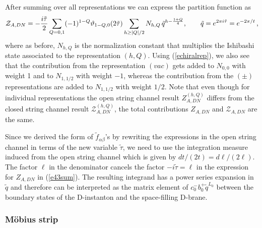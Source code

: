 \documentclass[12pt,a4paper]{article}
\newcommand{\refb}[1]{(\ref{#1})}
\newcommand{\I}{\mathrm{i}}
\newcommand{\vt}{\vartheta}
\newcommand{\cZ}{\mathcal{Z}}
\def\I{i}
\def\ttau{\tilde\tau}
\begin{document}
After summing over all representations we can express
the partition function as
\begin{align} \label{e43sum}
\cZ_{A,DN}
=-\frac{ \I  \ttau}{2}  \sum_{Q=0,1} (-1)^{1-Q}  \vt_{1-Q,0} ( 2 \ttau) \sum_{h\ge |Q|/2} N_{h,Q}\,
\tilde q^{h - {1 +Q \over 4} },
\qquad
\tilde q=e^{2\pi i\ttau} = e^{-2\pi/t}\,  ,
\end{align}
where as before, $N_{h,Q}$ is the normalization constant that multiplies the Ishibashi state
associated to the representation $(h,Q)$.
Using \refb{echiralrep}, we also see that the contribution from the representation $(vac)$
gets added to $N_{0,0}$ with weight 1 and to $N_{1,1/2}$ with weight $-1$,
whereas the contribution from the $(\pm)$ representations are added to $N_{1,1/2}$ with weight $1/2$. Note that even though for individual representations the open string channel
result $Z^{(h,Q)}_{A,DN}$ differs from the closed string channel result $\cZ^{(h,Q)}_{A,DN}$,
the total contributions $Z_{A,DN}$ and $\cZ_{A,DN}$ are the same.



Since we derived the form of $\tilde f_{\alpha\beta}$'s by rewriting the expressions in the
open string channel in terms of the new variable $\ttau$,
we need to use the integration measure induced from the open string
channel which is given by $dt/(2t)=d\ell/(2\ell)$.
The factor $\ell$ in the denominator cancels the factor $-i\ttau=\ell$ in the
expression for $Z_{A,DN}$ in \refb{e43sum}. The resulting integrand has a power
series expansion in $\tilde q$ and therefore can be interpreted as the matrix element of
$c_0^- b_0^+ \tilde q^{L_0}$ between the boundary states of the D-instanton and the
space-filling D-brane.


\subsubsection{M\"{o}bius strip}
\label{sE-open-mobius}
\end{document}
